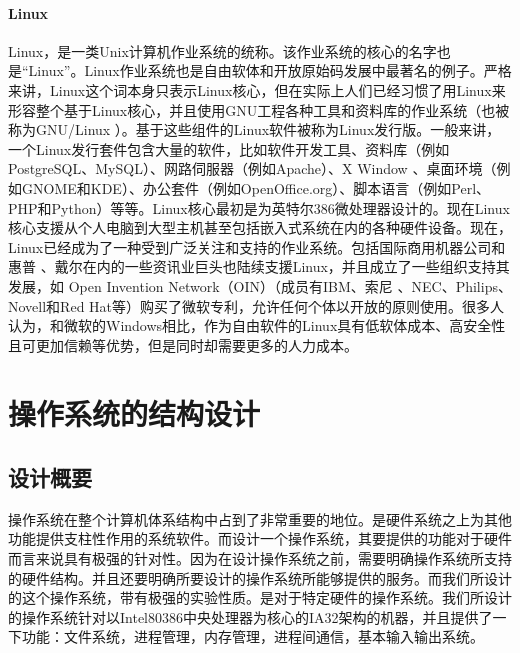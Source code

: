 \documentclass[UTF8,nofonts,cs4size]{ctexrep}
\begin{document}
\subsubsection{Linux}
Linux，是一类Unix计算机作业系统的统称。该作业系统的核心的名字也是“Linux”。Linux作业系统也是自由软体和开放原始码发展中最著名的例子。严格来讲，Linux这个词本身只表示Linux核心，但在实际上人们已经习惯了用Linux来形容整个基于Linux核心，并且使用GNU工程各种工具和资料库的作业系统（也被称为GNU/Linux ）。基于这些组件的Linux软件被称为Linux发行版。一般来讲，一个Linux发行套件包含大量的软件，比如软件开发工具、资料库（例如 PostgreSQL、MySQL）、网路伺服器（例如Apache）、X Window 、桌面环境（例如GNOME和KDE）、办公套件（例如OpenOffice.org）、脚本语言（例如Perl、PHP和Python）等等。Linux核心最初是为英特尔386微处理器设计的。现在Linux核心支援从个人电脑到大型主机甚至包括嵌入式系统在内的各种硬件设备。现在，Linux已经成为了一种受到广泛关注和支持的作业系统。包括国际商用机器公司和惠普 、戴尔在内的一些资讯业巨头也陆续支援Linux，并且成立了一些组织支持其发展，如 Open Invention Network（OIN）（成员有IBM、索尼 、NEC、Philips、Novell和Red Hat等）购买了微软专利，允许任何个体以开放的原则使用。很多人认为，和微软的Windows相比，作为自由软件的Linux具有低软体成本、高安全性且可更加信赖等优势，但是同时却需要更多的人力成本。

\chapter{操作系统的结构设计}
\section{设计概要}
操作系统在整个计算机体系结构中占到了非常重要的地位。是硬件系统之上为其他功能提供支柱性作用的系统软件。而设计一个操作系统，其要提供的功能对于硬件而言来说具有极强的针对性。因为在设计操作系统之前，需要明确操作系统所支持的硬件结构。并且还要明确所要设计的操作系统所能够提供的服务。而我们所设计的这个操作系统，带有极强的实验性质。是对于特定硬件的操作系统。我们所设计的操作系统针对以Intel80386中央处理器为核心的IA32架构的机器，并且提供了一下功能：文件系统，进程管理，内存管理，进程间通信，基本输入输出系统。
\end{document}
